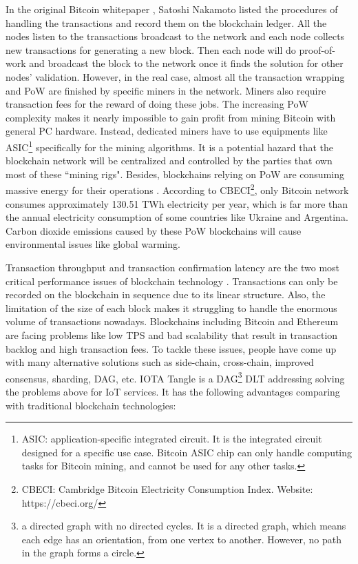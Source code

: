 In the original Bitcoin whitepaper \cite{nakamoto2008peer}, Satoshi Nakamoto listed the procedures of handling the transactions and record them on the blockchain ledger.
All the nodes listen to the transactions broadcast to the network and each node collects new transactions for generating a new block.
Then each node will do proof-of-work and broadcast the block to the network once it finds the solution for other nodes' validation.
However, in the real case, almost all the transaction wrapping and PoW are finished by specific miners in the network. Miners also require transaction fees for the reward of doing these jobs.
The increasing PoW complexity makes it nearly impossible to gain profit from mining Bitcoin with general PC hardware. Instead, dedicated miners have to use equipments like ASIC\footnote{ASIC: application-specific integrated circuit. It is the integrated circuit designed for a specific use case. Bitcoin ASIC chip can only handle computing tasks for Bitcoin mining, and cannot be used for any other tasks.} specifically for the mining algorithms.
It is a potential hazard that the blockchain network will be centralized and controlled by the parties that own most of these ``mining rigs". Besides, blockchains relying on PoW are consuming massive energy for their operations \cite{sedlmeir2020energy}. According to CBECI\footnote{CBECI: Cambridge Bitcoin Electricity Consumption Index. Website: https://cbeci.org/}, only Bitcoin network consumes approximately 130.51 TWh electricity per year, which is far more than the annual electricity consumption of some countries like Ukraine and Argentina. Carbon dioxide emissions caused by these PoW blockchains will cause environmental issues like global warming.


Transaction throughput and transaction confirmation latency are the two most critical performance issues of blockchain technology \cite{zhou2020solutions}.
Transactions can only be recorded on the blockchain in sequence due to its linear structure. Also, the limitation of the size of each block makes it struggling to handle the enormous volume of transactions nowadays.
Blockchains including Bitcoin and Ethereum are facing problems like low TPS and bad scalability that result in transaction backlog and high transaction fees.
To tackle these issues, people have come up with many alternative solutions such as side-chain, cross-chain, improved consensus, sharding, DAG, etc.
IOTA Tangle is a DAG\footnote{a directed graph with no directed cycles. It is a directed graph, which means each edge has an orientation, from one vertex to another. However, no path in the graph forms a circle.} DLT addressing solving the problems above for IoT services. It has the following advantages comparing with traditional blockchain technologies:

